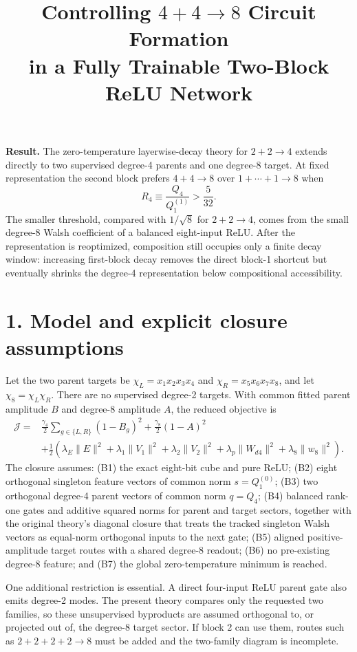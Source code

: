 \documentclass[10pt]{article}
\title{\vspace{-1.25cm}\textbf{Controlling $4+4\!\to\!8$ Circuit Formation\\
in a Fully Trainable Two-Block ReLU Network}}
\author{}
\date{\vspace{-1.2cm}}
\begin{document}
\maketitle
\vspace{-0.72cm}

\textbf{Result.}
The zero-temperature layerwise-decay theory for $2+2\!\to\!4$ extends directly to two
supervised degree-4 parents and one degree-8 target.  At fixed representation the second
block prefers $4+4\!\to\!8$ over $1+\cdots+1\!\to\!8$ when
\[
\boxed{R_4\equiv \frac{Q_4}{Q_1^{(1)}}>\frac{5}{32}.}
\]
The smaller threshold, compared with $1/\sqrt8$ for $2+2\!\to\!4$, comes from the small
degree-8 Walsh coefficient of a balanced eight-input ReLU.  After the representation is
reoptimized, composition still occupies only a finite decay window: increasing first-block
decay removes the direct block-1 shortcut but eventually shrinks the degree-4 representation
below compositional accessibility.

\section*{1. Model and explicit closure assumptions}
Let the two parent targets be
$\chi_L=x_1x_2x_3x_4$ and $\chi_R=x_5x_6x_7x_8$, and let
$\chi_8=\chi_L\chi_R$.  There are no supervised degree-2 targets.  With common fitted parent
amplitude $B$ and degree-8 amplitude $A$, the reduced objective is
\begin{align}
\mathcal J={}&\frac{\gamma_4}{2}\sum_{g\in\{L,R\}}(1-B_g)^2
+\frac{\gamma_8}{2}(1-A)^2 \nonumber\\[-2pt]
&+\frac12\left(\lambda_E\|E\|^2+\lambda_1\|V_1\|^2+
\lambda_2\|V_2\|^2+\lambda_p\|W_{d4}\|^2+\lambda_8\|w_8\|^2\right).
\label{eq:objective8}
\end{align}
The closure assumes: (B1) the exact eight-bit cube and pure ReLU; (B2) eight orthogonal
singleton feature vectors of common norm $s=Q_1^{(0)}$; (B3) two orthogonal degree-4 parent
vectors of common norm $q=Q_4$; (B4) balanced rank-one gates and additive squared norms for
parent and target sectors, together with the original theory's diagonal closure that treats
the tracked singleton Walsh vectors as equal-norm orthogonal inputs to the next gate; (B5)
aligned positive-amplitude target routes with a shared
degree-8 readout; (B6) no pre-existing degree-8 feature; and (B7) the global zero-temperature
minimum is reached.

One additional restriction is essential.  A direct four-input ReLU parent gate also emits
degree-2 modes.  The present theory compares only the requested two families, so these
unsupervised byproducts are assumed orthogonal to, or projected out of, the degree-8 target
sector.  If block 2 can use them, routes such as $2+2+2+2\!\to\!8$ must be added and the
two-family diagram is incomplete.
\end{document}
